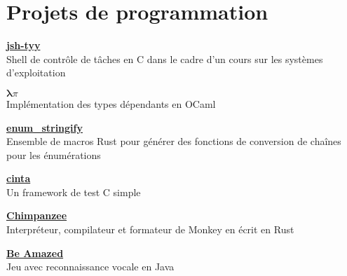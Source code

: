 \documentclass[12pt]{article}
\newcommand{\entry}[4]{{{\textbf{#1}}} \hfill #3 \\ #2 \hfill #4}
\begin{document}
\section{Projets de programmation}

\begin{paracol}{2}
	\entry{\href{https://github.com/Yag000/jsh-tyy}{jsh-tyy}}{Shell de contrôle de tâches en C dans le cadre d'un cours sur les systèmes d'exploitation}{ }{ }
	\medskip
	\switchcolumn

	\entry{\href{https://moule.informatique.univ-paris-diderot.fr/iglesias/U3bbU3c0}{$\pmb\lambda\pi$}}{Implémentation des types dépendants en OCaml}{ }{ }
	\medskip
	\switchcolumn


	\entry{\href{https://github.com/Yag000/enum_stringify}{enum\_stringify}}{Ensemble de macros Rust pour générer des fonctions de conversion de chaînes pour les énumérations}{ }{ }
	\bigskip
	\switchcolumn

	\entry{\href{https://github.com/Yag000/cinta}{cinta}}{Un framework de test C simple}{ }{ }
	\bigskip
	\bigskip
	\switchcolumn

	\entry{\href{https://github.com/Yag000/chimpanzee}{Chimpanzee}}{Interpréteur, compilateur et formateur de Monkey en écrit en Rust}{ }{ }
	\switchcolumn

	\entry{\href{https://github.com/GabinDDL/L2S2-GYTMY-Game}{Be Amazed}}{Jeu avec reconnaissance vocale en Java}{ }{ }

\end{paracol}

\nocite{*} 
\renewcommand{\refname}{Recherche} %


\end{document}
